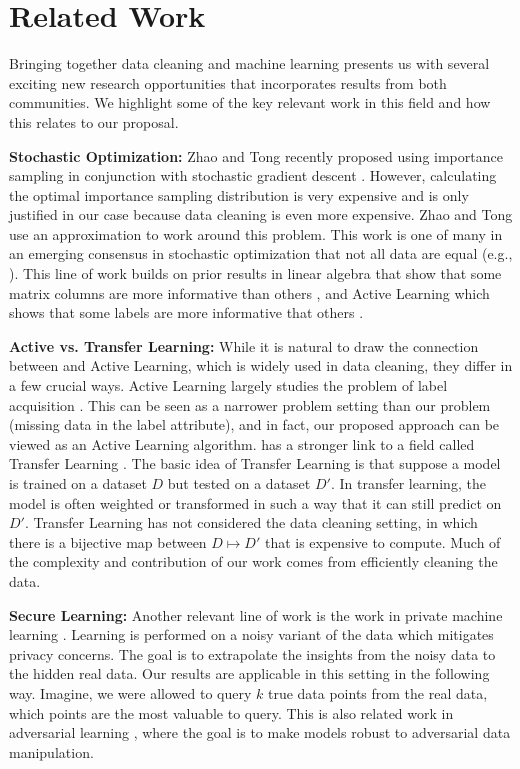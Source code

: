 \section{Related Work}
Bringing together data cleaning and machine learning presents us with several exciting new research opportunities that incorporates results from both communities.
We highlight some of the key relevant work in this field and how this relates to our proposal.

\noindent \textbf{Stochastic Optimization: } Zhao and Tong recently proposed using importance sampling in conjunction with stochastic gradient descent \cite{zhao2014stochastic}. However, calculating the optimal importance sampling distribution is very expensive and is only justified in our case because data cleaning is even more expensive. Zhao and Tong use an approximation to work around this problem. This work is one of many in an emerging consensus in stochastic optimization that not all data are equal (e.g., \cite{qu2014randomized}). This line of work builds on prior results in linear algebra that show that some matrix columns are more informative than others \cite{rineas2012fast}, and Active Learning which shows that some labels are more informative that others \cite{settles2010active}.

\noindent \textbf{Active vs. Transfer Learning: } While it is natural to draw the connection between \sys and Active Learning, which is widely used in data cleaning, they differ in a few crucial ways. 
Active Learning largely studies the problem of label acquisition \cite{settles2010active}.
This can be seen as a narrower problem setting than our problem (missing data in the label attribute), and in fact, our proposed approach can be viewed as an Active Learning algorithm.
\sys has a stronger link to a field called Transfer Learning \cite{pan2010survey}. The basic idea of Transfer Learning is that suppose a model is trained on a dataset $D$ but tested on a dataset $D'$. In transfer learning, the model is often weighted or transformed in such a way that it can still predict on $D'$. Transfer Learning has not considered the data cleaning setting, in which there is a bijective map between $D \mapsto D'$ that is expensive to compute. Much of the complexity and contribution of our work comes from efficiently cleaning the data.

\noindent \textbf{Secure Learning: } Another relevant line of work is the work in private machine learning  \cite{wainwright2012privacy, duchi2013local}. Learning is performed on a noisy variant of the data which mitigates privacy concerns. The goal is to extrapolate the insights from the noisy data to the hidden real data. Our results are applicable in this setting in the following way. Imagine, we were allowed to query $k$ true data points from the real data, which points are the most valuable to query. This is also related work in adversarial learning \cite{nelson2012query}, where the goal is to make models robust to adversarial data manipulation.

